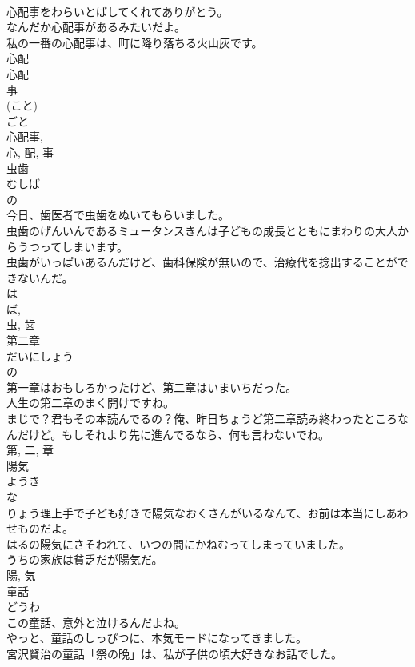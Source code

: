 \documentclass[8pt]{extreport}
\begin{document}
\begin{CJK}{UTF8}{min}
\\	心配事をわらいとばしてくれてありがとう。	
\\	なんだか心配事があるみたいだよ。	
\\	私の一番の心配事は、町に降り落ちる火山灰です。	
\\	心配 
\\	心配 
\\	事 
\\	(こと) 
\\	ごと 
\\	心配事, 
\\	心, 配, 事	
\\	虫歯	
\\	むしば	
\\	の 
\\	今日、歯医者で虫歯をぬいてもらいました。	
\\	虫歯のげんいんであるミュータンスきんは子どもの成長とともにまわりの大人からうつってしまいます。	
\\	虫歯がいっぱいあるんだけど、歯科保険が無いので、治療代を捻出することができないんだ。	
\\	は 
\\	ば, 
\\	虫, 歯	
\\	第二章	
\\	だいにしょう	
\\	の 
\\	第一章はおもしろかったけど、第二章はいまいちだった。	
\\	人生の第二章のまく開けですね。	
\\	まじで？君もその本読んでるの？俺、昨日ちょうど第二章読み終わったところなんだけど。もしそれより先に進んでるなら、何も言わないでね。	
\\	第, 二, 章	
\\	陽気	
\\	ようき	
\\	な 
\\	りょう理上手で子ども好きで陽気なおくさんがいるなんて、お前は本当にしあわせものだよ。	
\\	はるの陽気にさそわれて、いつの間にかねむってしまっていました。	
\\	うちの家族は貧乏だが陽気だ。	
\\	陽, 気	
\\	童話	
\\	どうわ	
\\	この童話、意外と泣けるんだよね。	
\\	やっと、童話のしっぴつに、本気モードになってきました。	
\\	宮沢賢治の童話「祭の晩」は、私が子供の頃大好きなお話でした。	

\end{CJK}
\end{document}

